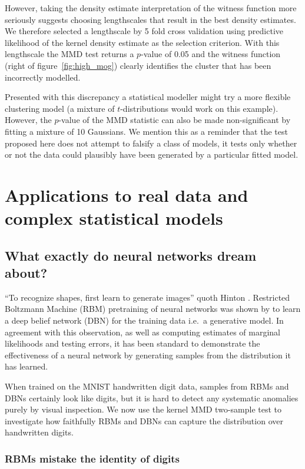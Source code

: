 \documentclass{article} %
\def\ie{i.e.\ }
\begin{document}
However, taking the density estimate interpretation of the witness function more seriously suggests choosing lengthscales that result in the best density estimates.
We therefore selected a lengthscale by 5 fold cross validation using predictive likelihood of the kernel density estimate as the selection criterion.
With this lengthscale the MMD test returns a $p$-value of 0.05 and the witness function (right of figure~\ref{fig:high_mog}) clearly identifies the cluster that has been incorrectly modelled.

Presented with this discrepancy a statistical modeller might try a more flexible clustering model \citep{Peel2000-pv, Iwata2012-yj} (a mixture of $t$-distributions would work on this example).
However, the $p$-value of the MMD statistic can also be made non-significant by fitting a mixture of 10 Gaussians.
We mention this as a reminder that the test proposed here does not attempt to falsify a class of models, it tests only whether or not the data could plausibly have been generated by a particular fitted model.

\section{Applications to real data and complex statistical models}

\subsection{What exactly do neural networks dream about?}

``To recognize shapes, first learn to generate images'' quoth Hinton \citep{Hinton2007-eo}.
Restricted Boltzmann Machine (RBM) pretraining of neural networks was shown by \cite{Hinton2006-yw} to learn a deep belief network (DBN) for the training data \ie a generative model.
In agreement with this observation, as well as computing estimates of marginal likelihoods and testing errors, it has been standard to demonstrate the effectiveness of a neural network by generating samples from the distribution it has learned.

When trained on the MNIST handwritten digit data, samples from RBMs and DBNs certainly look like digits, but it is hard to detect any systematic anomalies purely by visual inspection.
We now use the kernel MMD two-sample test to investigate how faithfully RBMs and DBNs can capture the distribution over handwritten digits.

\subsubsection{RBMs mistake the identity of digits}
\end{document}
